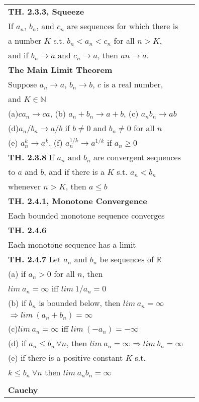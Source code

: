 \documentclass[10 pt,landscape]{article}
\begin{document}
\begin{multicols}{4}
\begin{tabular}{@{}ll@{}}

\textbf{TH. 2.3.3, Squeeze}\\
If $a_n$, $b_n$, and $c_n$ are sequences for which there is \\a number $K$ s.t. $b_n<a_n<c_n$ for all $n>K$, \\and if
$b_n\rightarrow a$ and $c_n\rightarrow a$, then $an\rightarrow a$.\\
\textbf{The Main Limit Theorem}\\
Suppose $a_n\rightarrow a$, $b_n\rightarrow b$, $c$ is a real number,\\ and $K \in \mathbb{N}$\\
(a)$ca_n\rightarrow ca$, (b) $a_n +b_n \rightarrow a+b$, (c) $a_nb_n\rightarrow ab$\\
(d)$a_n/b_n\rightarrow a/b$ if $b\ne 0$ and $b_n\ne 0$ for all $n$\\
(e) $a_n^k \rightarrow a^k$, (f) $a_n^{1/k} \rightarrow a^{1/k}$ if $a_n\geq 0$\\
\textbf{TH. 2.3.8} If $a_n$ and $b_n$ are convergent sequences \\to $a$ and $b$, and if there is a $K$ s.t. $a_n<b_n$\\ whenever $n>K$,  then $a\leq b$\\
\textbf{TH. 2.4.1, Monotone Convergence} \\Each bounded monotone sequence converges\\
\textbf{TH. 2.4.6} \\Each monotone sequence has a limit\\
\textbf{TH. 2.4.7} Let $a_n$ and $b_n$ be sequences of $\mathbb{R}$\\
(a) if $a_n>0$ for all $n$, then\\ $lim\:a_n=\infty $ iff $lim\:1/a_n=0$\\
(b) if $b_n$ is bounded below, then $lim\:a_n=\infty$ \\$\Rightarrow lim\: (a_n+b_n)=\infty$\\
(c)$lim\:a_n=\infty$ iff $lim\:(-a_n)=-\infty$\\
(d) if $a_n\leq b_n \, \forall n$, then $lim\:a_n=\infty \Rightarrow lim\:b_n=\infty$\\
(e) if there is a positive constant $K$ s.t. \\ $k\leq b_n \ \forall n$
then $lim\:a_nb_n=\infty$\\
\\
\textbf{Cauchy}\\

\end{tabular}
\end{multicols}
\end{document}
